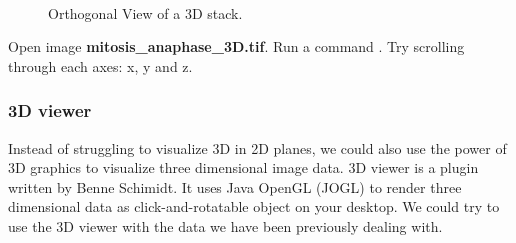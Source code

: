 \begin{figure}[h!]
\\
 \caption{Orthogonal View of a 3D stack.}
 \label{fig:orthogonalView}
\end{figure}

\begin{indentexercise}{3}
Open image \textbf{mitosis\_anaphase\_3D.tif}.
Run a command . Try scrolling through each axes: x, y and z. 
\end{indentexercise}

\subsubsection{3D viewer}

Instead of struggling to visualize 3D in 2D planes, we could also use the power of 3D graphics to visualize three dimensional image data. 3D viewer is a plugin written by Benne Schimidt. It uses Java OpenGL (JOGL) to render three dimensional data as click-and-rotatable object on your desktop. We could try to use the 3D viewer with the data we have been previously dealing with. 

